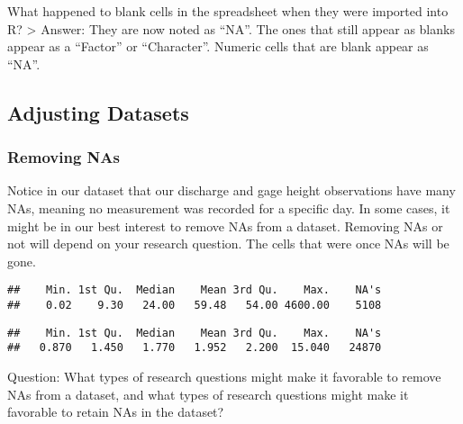\documentclass[]{article}
\newenvironment{Shaded}{\begin{snugshade}}{\end{snugshade}}
\newcommand{\KeywordTok}[1]{\textcolor[rgb]{0.13,0.29,0.53}{\textbf{#1}}}
\newcommand{\NormalTok}[1]{#1}
\newcommand{\OperatorTok}[1]{\textcolor[rgb]{0.81,0.36,0.00}{\textbf{#1}}}
\begin{document}
What happened to blank cells in the spreadsheet when they were imported
into R? \textgreater{} Answer: They are now noted as ``NA''. The ones
that still appear as blanks appear as a ``Factor'' or ``Character''.
Numeric cells that are blank appear as ``NA''.

\hypertarget{adjusting-datasets}{%
\subsection{Adjusting Datasets}\label{adjusting-datasets}}

\hypertarget{removing-nas}{%
\subsubsection{Removing NAs}\label{removing-nas}}

Notice in our dataset that our discharge and gage height observations
have many NAs, meaning no measurement was recorded for a specific day.
In some cases, it might be in our best interest to remove NAs from a
dataset. Removing NAs or not will depend on your research question. The
cells that were once NAs will be gone.

\begin{Shaded}
\end{Shaded}

\begin{verbatim}
##    Min. 1st Qu.  Median    Mean 3rd Qu.    Max.    NA's 
##    0.02    9.30   24.00   59.48   54.00 4600.00    5108
\end{verbatim}

\begin{Shaded}
\end{Shaded}

\begin{verbatim}
##    Min. 1st Qu.  Median    Mean 3rd Qu.    Max.    NA's 
##   0.870   1.450   1.770   1.952   2.200  15.040   24870
\end{verbatim}

Question: What types of research questions might make it favorable to
remove NAs from a dataset, and what types of research questions might
make it favorable to retain NAs in the dataset?
\end{document}

